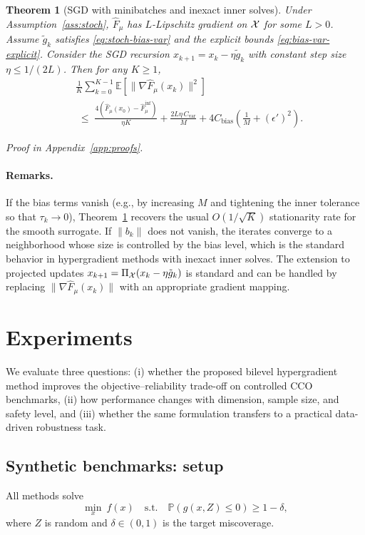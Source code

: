 \documentclass{uai2026} %
\theoremstyle{plain}
\newtheorem{theorem}{Theorem}
\theoremstyle{definition}
\begin{document}
\begin{theorem}[SGD with minibatches and inexact inner solves]\label{thm:sgd}
Under Assumption~\ref{ass:stoch}, $\widehat F_\mu$ has $L$-Lipschitz gradient on $\mathcal{X}$ for some $L>0$.
Assume $\tilde g_k$ satisfies \eqref{eq:stoch-bias-var} and the explicit bounds \eqref{eq:bias-var-explicit}.
Consider the SGD recursion $x_{k+1}=x_k-\eta \tilde g_k$ with constant step size $\eta\le 1/(2L)$.
Then for any $K\ge 1$,
\begin{align}
  &\frac{1}{K}\sum_{k=0}^{K-1}\mathbb{E}\!\left[\|\nabla \widehat F_\mu(x_k)\|^2\right]\nonumber\\
  &\;\le\;
  \frac{4(\widehat F_\mu(x_0)-\widehat F_\mu^{\inf})}{\eta K}
  + \frac{2L\eta\,C_{\mathrm{var}}}{M}
  + 4C_{\mathrm{bias}}\!\left(\frac{1}{M}+(\epsilon')^2\right).\label{eq:sgd-rate}
\end{align}
\end{theorem}
\emph{Proof in Appendix~\ref{app:proofs}.}

\paragraph{Remarks.}
If the bias terms vanish (e.g., by increasing $M$ and tightening the inner tolerance so that $\tau_k\to 0$), Theorem~\ref{thm:sgd} recovers the usual $O(1/\sqrt{K})$ stationarity rate for the smooth surrogate.
If $\|b_k\|$ does not vanish, the iterates converge to a neighborhood whose size is controlled by the bias level, which is the standard behavior in hypergradient methods with inexact inner solves.
The extension to projected updates $x_{k+1}=\Pi_{\mathcal{X}}(x_k-\eta \tilde g_k)$ is standard and can be handled by replacing $\|\nabla \widehat F_\mu(x_k)\|$ with an appropriate gradient mapping.

\section{Experiments}\label{sec:experiments}
We evaluate three questions: (i) whether the proposed bilevel hypergradient method improves the objective--reliability trade-off on controlled CCO benchmarks, (ii) how performance changes with dimension, sample size, and safety level, and (iii) whether the same formulation transfers to a practical data-driven robustness task.

\subsection{Synthetic benchmarks: setup}
All methods solve
\[
  \min_x\ f(x)\quad\text{s.t.}\quad \mathbb{P}\!\left(g(x,Z)\le 0\right)\ge 1-\delta,
\]
where $Z$ is random and $\delta\in(0,1)$ is the target miscoverage.
\end{document}
